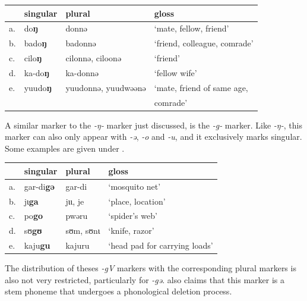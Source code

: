 \begin{exe}
    \ex \label{except-ng3}
    \begin{tabular}[t]{llll}
      & singular        & plural              & gloss                               \\
      \midrule
      a. & do\textbf{ŋ}    & donnə               & `mate, fellow, friend'             \\
      b. & bado\textbf{ŋ}  & badonnə             & `friend, colleague, comrade'        \\
      c. & cilo\textbf{ŋ}  & cilonnə, ciloonə    & `friend'                            \\
      d. & ka-do\textbf{ŋ} & ka-donnə            & `fellow wife'                       \\
      e. & yuudo\textbf{ŋ} & yuudonnə, yuudwəənə & `mate, friend of same age, \\
      &&& comrade' \\
    \end{tabular}
\end{exe}

A similar marker to the \textit{-ŋ-} marker just discussed, is the \textit{-g-} marker. Like \textit{-ŋ-}, this marker can also only appear with \textit{-ə}, \textit{-o} and \textit{-u}, and it exclusively marks singular. Some examples are given under .

\begin{exe}
    \ex \label{g-exe-kasem}
    \begin{tabular}[t]{llll}
      & singular & plural    & gloss                         \\
      \midrule
      a. & gar-di\textbf{gə} & gar-di    & `mosquito net'                \\
      b. & jɩ\textbf{ga}     & jɩɩ, je      & `place, location'          \\
      c. & po\textbf{go}     & pwəru     & `spider's web'                \\
      d. & sʊ\textbf{gʊ}     & sʊm, sʊnɩ & `knife, razor'                \\
      e. & kaju\textbf{gu}   & kajuru    & `head pad for carrying loads' \\
    \end{tabular}
\end{exe}

The distribution of theses \textit{-gV} markers with the corresponding plural markers is also not very restricted, particularly for \textit{-gə}. \textcites{Callow.1965} also claims that this marker is a stem phoneme that undergoes a phonological deletion process.

